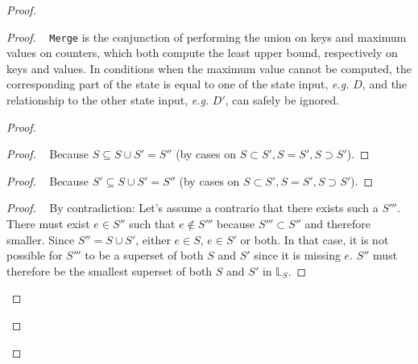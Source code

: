 \documentclass[11pt, oneside]{article}   	%
\begin{document}
\begin{proof}
	\begin{proof}
		\pfsketch~ \texttt{Merge} is the conjunction of performing the union on keys and maximum values on counters, which both compute the least upper bound, respectively on keys and values. In conditions when the maximum value cannot be computed, the corresponding part of the state is equal to one of the state input, \textit{e.g.} $D$, and the relationship to the other state input, \textit{e.g.} $D'$, can safely be ignored.
		\begin{proof}
			\begin{proof}
				\pf~ Because $S \subseteq S \cup S' = S''$ (by cases on $S \subset S', S=S', S \supset S'$).
			\end{proof}
			
			\begin{proof}
				\pf~ Because $S' \subseteq S \cup S' = S''$ (by cases on $S \subset S', S=S', S \supset S'$).
			\end{proof}
			
			\begin{proof}
				\pf~ By contradiction: Let's assume a contrario that there exists such a $S'''$. There must exist $e \in S''$ such that $e \notin S'''$ because $S''' \subset S''$ and therefore smaller. Since $S'' = S \cup S'$, either $e \in S$, $e \in S'$ or both. In that case, it is not possible for $S'''$ to be a superset of both $S$ and $S'$ since it is missing $e$. $S''$ must therefore be the smallest superset of both $S$ and $S'$ in $\mathds{L}_S$.
			\end{proof}


\end{proof}
\end{proof}
\end{proof}
\end{document}
